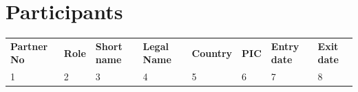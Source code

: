 %
%

\section{Participants}


\def\arraystretch{1.25}
{\fontsize{9}{11}\selectfont

    \setlength{\arrayrulewidth}{0.5pt} %
    {\color{black}\begin{tabularx}{\textwidth}{|X|X|X|X|X|X|X|X|} \hline
        \rowcolor{mylightergray}\multicolumn{8}{|l|}{PARTICIPANTS} \\ \hline
        \rowcolor{mylightergray}
        \textbf{Partner No} & \textbf{Role} & \textbf{Short name} & \textbf{Legal Name} &
        \textbf{Country} & \textbf{PIC} & \textbf{Entry date} & \textbf{Exit date} \\ \hline
        1 & 2 & 3 & 4 & 5 & 6 & 7 & 8 \\ \hline
    \hline
    \end{tabularx}}
}
